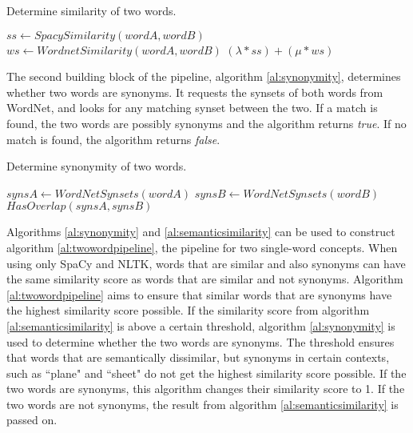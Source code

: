 \documentclass{article}
\begin{document}
\begin{algorithm}
\caption{Determine similarity of two words.}\label{al:semanticsimilarity}
\begin{algorithmic}[1]
		\State $\textit{ss} \gets \textit{SpacySimilarity}(wordA, wordB)$
		\State $\textit{ws} \gets \textit{WordnetSimilarity}(wordA, wordB)$
		\State \Return $(\lambda*ss)+(\mu*ws)$
	\EndProcedure
\end{algorithmic}
\end{algorithm}

The second building block of the pipeline, algorithm \ref{al:synonymity}, determines whether two words are synonyms. It requests the synsets of both words from WordNet, and looks for any matching synset between the two. If a match is found, the two words are possibly synonyms and the algorithm returns \textit{true}. If no match is found, the algorithm returns \textit{false}.

\begin{algorithm}
\caption{Determine synonymity of two words.}\label{al:synonymity}
\begin{algorithmic}[1]
		\State $\textit{synsA} \gets \textit{WordNetSynsets}(wordA)$
		\State $\textit{synsB} \gets \textit{WordNetSynsets}(wordB)$
		\State \Return $\textit{HasOverlap}(synsA, synsB)$
	\EndProcedure
\end{algorithmic}
\end{algorithm}

Algorithms \ref{al:synonymity} and \ref{al:semanticsimilarity} can be used to construct algorithm \ref{al:twowordpipeline}, the pipeline for two single-word concepts.  When using only SpaCy and NLTK, words that are similar and also synonyms can have the same similarity score as words that are similar and not synonyms. Algorithm \ref{al:twowordpipeline} aims to ensure that similar words that are synonyms have the highest similarity score possible. If the similarity score from algorithm \ref{al:semanticsimilarity} is above a certain threshold, algorithm \ref{al:synonymity} is used to determine whether the two words are synonyms. The threshold ensures that words that are semantically dissimilar, but synonyms in certain contexts, such as ``plane" and ``sheet" do not get the highest similarity score possible. If the two words are synonyms, this algorithm changes their similarity score to 1. If the two words are not synonyms, the result from algorithm \ref{al:semanticsimilarity} is passed on.
\end{document}

